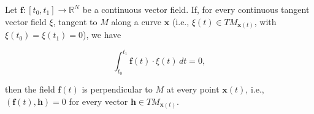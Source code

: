 Let $\mathbf{f} : [t_0, t_1] \to \mathbb{R}^N$ be a continuous vector field. If, for every continuous tangent vector field $\xi$, tangent to $M$ along a curve $\mathbf{x}$ (i.e., $\xi(t) \in TM_{\mathbf{x}(t)}$, with $\xi(t_0) = \xi(t_1) = 0$), we have

$$\int_{t_0}^{t_1} \mathbf{f}(t) \cdot \xi(t) \, dt = 0,$$

then the field $\mathbf{f}(t)$ is perpendicular to $M$ at every point $\mathbf{x}(t)$, i.e., $(\mathbf{f}(t), \mathbf{h}) = 0$ for every vector $\mathbf{h} \in TM_{\mathbf{x}(t)}$.
